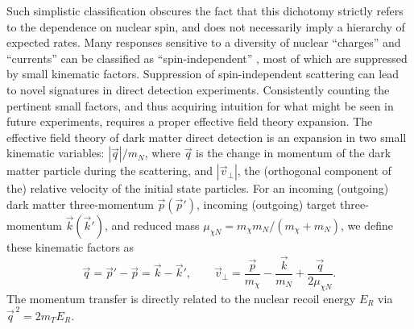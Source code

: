 \documentclass[11pt]{article}
\newcommand{\beq}{\begin{equation}} \newcommand{\eeq}{\end{equation}}
\begin{document}
Such simplistic classification obscures the fact that this dichotomy strictly refers to the dependence on nuclear spin, and does not necessarily imply a hierarchy of expected rates. Many responses sensitive to a diversity of nuclear ``charges'' and ``currents'' can be classified as ``spin-independent'' \cite{Fitzpatrick:2012ix}, most of which are suppressed by small kinematic factors. Suppression of spin-independent scattering can lead to novel signatures in direct detection experiments. Consistently counting the pertinent small factors, and thus acquiring intuition for what might be seen in future experiments, requires a proper effective field theory expansion. The effective field theory of dark matter direct detection \cite{Fitzpatrick:2012ix, Anand:2013yka} is an expansion in two small kinematic variables: $|\vec q|/m_N$, where $\vec q$ is the change in momentum of the dark matter particle during the scattering, and $|\vec v_\perp|$, the (orthogonal component of the) relative velocity of the initial state particles. For an incoming (outgoing) dark matter three-momentum $\vec p(\vec p')$, incoming (outgoing) target three-momentum $\vec k(\vec k')$, and reduced mass $\mu_{\chi N} = m_\chi m_N/(m_\chi +m_N)$, we define these kinematic factors as \cite{Fitzpatrick:2012ix}
\beq \label{eq:kinematic-definitions}
\vec q=\vec p'-\vec p=\vec k-\vec k', \qquad \vec v_\perp=\frac{\vec p}{m_\chi}-\frac{\vec k}{m_N}+\frac{\vec q}{2\mu_{\chi N}}.
\eeq
The momentum transfer is directly related to the nuclear recoil energy $E_R$ via $\vec{q}^{\, 2} =2m_TE_R$.
\end{document}
